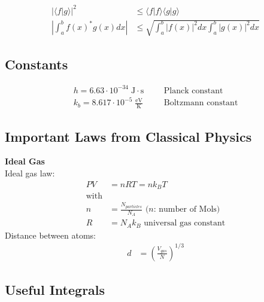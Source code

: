 \begin{align*}
    |\langle f|g \rangle |^2                  & \leq \langle f|f \rangle \langle g|g \rangle                 \\
    \left|\int_{a}^{b}{f(x)}^{*}g(x)dx\right| & \leq \sqrt{\int_{a}^{b}|f(x)|^{2}dx\int_{a}^{b}|g(x)|^{2}dx}
\end{align*}

\subsection{Constants}
\noindent\begin{align*}
    h = 6.63 \cdot 10^{-34} \;\mathrm{J\cdot s}      &  &  & \text{Planck constant}    \\
    k_b =8.617 \cdot 10^{-5} \;\mathrm{\frac{eV}{K}} &  &  & \text{Boltzmann constant}
\end{align*}

\subsection{Important Laws from Classical Physics}
\textbf{Ideal Gas}\\
Ideal gas law:
\noindent\begin{align*}
    PV & =nRT=n k_B T                                             \\
    \text{with}                                                   \\
    n  & =\frac{N_{particles}}{N_A} \text{ ($n$: number of Mols)} \\
    R  & =N_A k_B \text{ universal gas constant}
\end{align*}
Distance between atoms:
\noindent\begin{align*}
    d & ={\left(\frac{V_{gas}}{N}\right)}^{1/3}
\end{align*}

\subsection{Useful Integrals}
